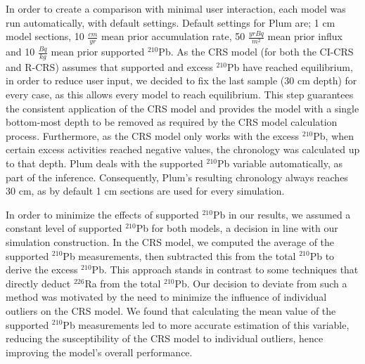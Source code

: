 \documentclass [10pt] {article}
\begin{document}
In order to create a comparison with minimal user interaction, each model was run automatically, with default settings.
Default settings for Plum are; 1 cm model sections, 10 $\frac{cm}{yr}$ mean prior accumulation rate, 50 $\frac{yr Bq}{m^2}$ mean prior influx and 10 $\frac{Bq}{kg}$ mean prior supported $^{210}$Pb.
As the CRS model (for both the CI-CRS and R-CRS) assumes that supported and excess $^{210}$Pb have reached equilibrium, in order to reduce user input, we decided to fix the last sample (30 cm depth) for every case, as this allows every model to reach equilibrium. This step guarantees the consistent application of the CRS model and provides the model with a single bottom-most depth to be removed as required by the CRS model calculation process. 
Furthermore, as the CRS model only works with the excess $^{210}$Pb, when certain excess activities reached negative values, the chronology was calculated up to that depth.
Plum deals with the supported $^{210}$Pb variable automatically, as part of the inference.
Consequently, Plum's resulting chronology always reaches 30 cm, as by default 1 cm sections are used for every simulation.

In order to minimize the effects of supported $^{210}$Pb in our results, we assumed a constant level of supported $^{210}$Pb for both models, a decision in line with our simulation construction. In the CRS model, we computed the average of the supported $^{210}$Pb measurements, then subtracted this from the total $^{210}$Pb to derive the excess $^{210}$Pb. This approach stands in contrast to some techniques that directly deduct $^{226}$Ra from the total $^{210}$Pb. Our decision to deviate from such a method was motivated by the need to minimize the influence of individual outliers on the CRS model. We found that calculating the mean value of the supported $^{210}$Pb measurements led to more accurate estimation of this variable, reducing the susceptibility of the CRS model to individual outliers, hence improving the model's overall performance.


\end{document}

